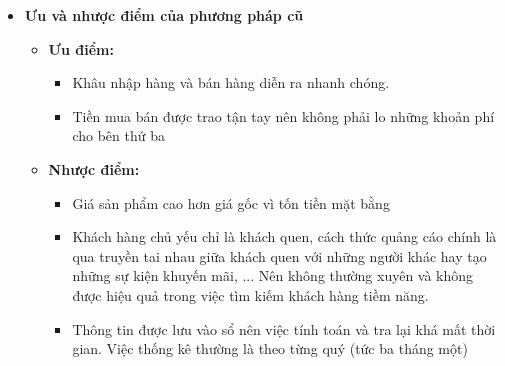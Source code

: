 \begin{itemize}
\begin{itemize}
        \end{itemize}
    \item\textbf{Ưu và nhược điểm của phương pháp cũ}\par
        \begin{itemize}
            \item\textbf{Ưu điểm:}
                \begin{itemize}
                    \item Khâu nhập hàng và bán hàng diễn ra nhanh chóng.
                    \item Tiền mua bán được trao tận tay nên không phải lo những khoản phí cho bên thứ ba
                \end{itemize}
            \item\textbf{Nhược điểm:}
                \begin{itemize}    
                    \item Giá sản phẩm cao hơn giá gốc vì tốn tiền mặt bằng
                    \item Khách hàng chủ yếu chỉ là khách quen, cách thức quảng cáo chính là qua truyền tai nhau giữa khách quen với những người khác hay tạo những sự kiện khuyến mãi, ... Nên không thường xuyên và không được hiệu quả trong việc tìm kiếm khách hàng tiềm năng.
                    \item Thông tin được lưu vào sổ nên việc tính toán và tra lại khá mất thời gian. Việc thống kê thường là theo từng quý (tức ba tháng một)
                \end{itemize}
        \end{itemize}
    \end{itemize}
